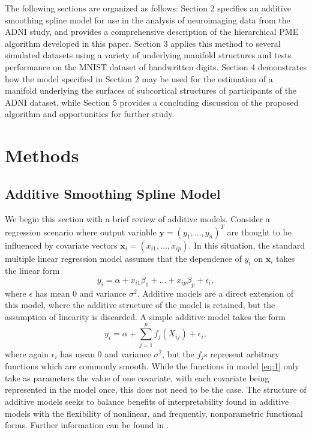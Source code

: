 \documentclass[11pt,reqno]{article}
\theoremstyle{definition}
\begin{document}
The following sections are organized as follows: Section 2 specifies an additive smoothing spline model for use in the analysis of neuroimaging data from the ADNI study, and provides a comprehensive description of the hierarchical PME algorithm developed in this paper. Section 3 applies this method to several simulated datasets using a variety of underlying manifold structures and tests performance on the MNIST dataset of handwritten digits. Section 4 demonstrates how the model specified in Section 2 may be used for the estimation of a manifold underlying the surfaces of subcortical structures of participants of the ADNI dataset, while Section 5 provides a concluding discussion of the proposed algorithm and opportunities for further study.

\section{Methods}

\subsection{Additive Smoothing Spline Model}

We begin this section with a brief review of additive models. Consider a regression scenario where output variable $\mathbf{y} = \left(y_1, \dots, y_n\right)^{T}$ are thought to be influenced by covariate vectors $\mathbf{x}_i = \left(x_{i1}, \dots, x_{ip}\right)$. In this situation, the standard multiple linear regression model assumes that the dependence of $y_i$ on $\mathbf{x}_i$ takes the linear form
\[%
  y_i = \alpha + x_{i1}\beta_1 + \dots + x_{ip}\beta_p + \epsilon_i
,\]%
where $\epsilon$ has mean 0 and variance $\sigma^2$. Additive models are a direct extension of this model, where the additive structure of the model is retained, but the assumption of linearity is discarded. A simple additive model takes the form
\begin{equation}
  y_i = \alpha + \sum_{j=1}^{p}f_j(X_{ij}) + \epsilon_i, \label{eq:1}
\end{equation}
where again $\epsilon_i$ has mean 0 and variance $\sigma^2$, but the $f_j$s represent arbitrary functions which are commonly smooth. While the functions in model \ref{eq:1} only take as parameters the value of one covariate, with each covariate being represented in the model once, this does not need to be the case. The structure of additive models seeks to balance benefits of interpretability found in additive models with the flexibility of nonlinear, and frequently, nonparametric functional forms. Further information can be found in \cite{hastieGeneralizedAdditiveModels1990}.
\end{document}
